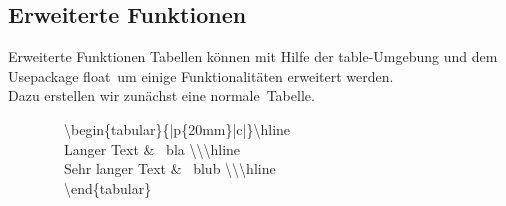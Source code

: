 \subsection{Erweiterte Funktionen}
\begin{frame}{Erweiterte Funktionen}
Tabellen k\"onnen mit Hilfe der \color{cpurple}table\color{black}-Umgebung und dem Usepackage \color{cturkis}float\color{black}~um einige Funktionalit\"aten erweitert werden.\\\vspace{2mm}
Dazu erstellen wir zun\"achst eine \glqq normale\grqq~Tabelle. \\\vspace{3mm}\small

~~~~~~~~\color{cturkis}\textbackslash begin\color{black}\{tabular\}\{|p\{20mm\}|c|\}\color{cred}\textbackslash hline \color{black}\\
~~~~~~~~Langer Text \color{cred}\&~\color{black} bla \color{cred}\textbackslash\textbackslash\textbackslash hline\\\color{black}
~~~~~~~~Sehr langer Text \color{cred}\&~\color{black} blub \color{cred}\textbackslash\textbackslash\textbackslash hline\color{black}\\
~~~~~~~~\color{cturkis}\textbackslash end\color{black}\{tabular\}\\
\normalsize
\end{frame}
